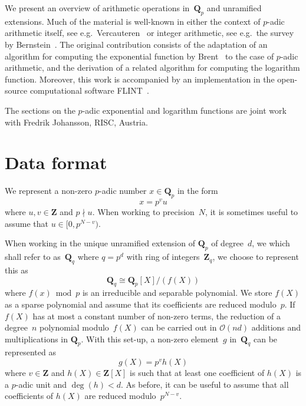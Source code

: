 We present an overview of arithmetic operations in~$\mathbf{Q}_p$ 
and unramified extensions.  Much of the material is well-known in 
either the context of $p$-adic arithmetic itself, see e.g.\ 
Vercauteren~\citep[\S 12]{HEHCC2005} or integer arithmetic, 
see e.g.\ the survey by Bernstein~\citep{Bernstein2008}. 
The original contribution consists of the adaptation of an algorithm 
for computing the exponential function by Brent~\citep{Brent1976} 
to the case of $p$-adic arithmetic, and the derivation of a related 
algorithm for computing the logarithm function.  Moreover, this 
work is accompanied by an implementation in the open-source computational 
software {\sc FLINT}~\citep{FLINT}.

The sections on the $p$-adic exponential and logarithm functions 
are joint work with Fredrik Johansson, RISC, Austria.

\section{Data format}

We represent a non-zero $p$-adic number $x \in \mathbf{Q}_p$ in the form 
\begin{equation*}
x = p^v u
\end{equation*}
where $u, v \in \mathbf{Z}$ and $p \nmid u$.  When working to precision~$N$, 
it is sometimes useful to assume that $u \in [0,p^{N-v})$.

When working in the unique unramified extension of $\mathbf{Q}_p$ of 
degree~$d$, we which shall refer to as~$\mathbf{Q}_q$ where $q = p^d$ 
with ring of integers~$\mathbf{Z}_q$, we choose to represent this as 
\begin{equation*}
\mathbf{Q}_q \cong \mathbf{Q}_p[X] / (f(X))
\end{equation*}
where $f(x) \bmod p$ is an irreducible and separable polynomial.  We store 
$f(X)$ as a sparse polynomial and assume that its coefficients are 
reduced modulo~$p$.  If $f(X)$ has at most a constant number of non-zero 
terms, the reduction of a degree~$n$ polynomial modulo~$f(X)$ can be carried 
out in $\mathcal{O}(nd)$ additions and multiplications in $\mathbf{Q}_p$.  
With this set-up, a non-zero element~$g$ in~$\mathbf{Q}_q$ can be represented 
as 
\begin{equation*}
g(X) = p^v h(X)
\end{equation*}
where $v \in \mathbf{Z}$ and $h(X) \in \mathbf{Z}[X]$ is such that at least 
one coefficient of $h(X)$ is a $p$-adic unit and $\deg(h) < d$.  As before, 
it can be useful to assume that all coefficients of $h(X)$ are reduced 
modulo~$p^{N-v}$.

